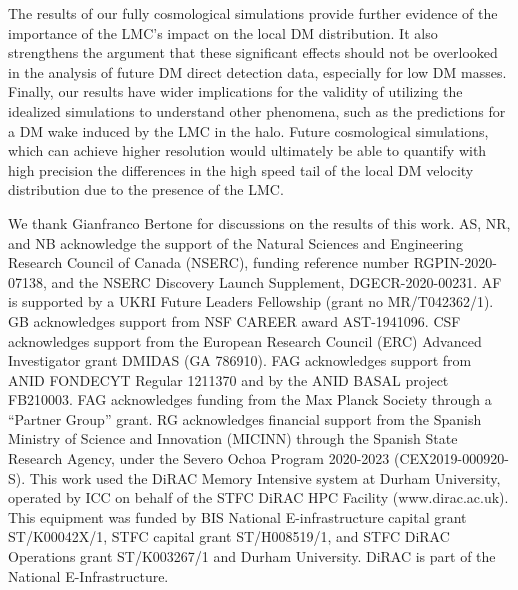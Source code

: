 The results of our fully cosmological simulations provide further evidence of the importance of the LMC's impact on the local DM distribution. It also strengthens the argument that these significant effects should not be overlooked in the analysis of future DM direct detection data, especially for low DM masses. Finally, our results have wider implications for the validity of utilizing the idealized simulations to understand other phenomena, such as the predictions for a DM wake induced by the LMC in the halo. Future cosmological simulations, which can achieve higher resolution would ultimately be able to quantify with high precision the differences in the high speed tail of the local DM velocity distribution due to the presence of the LMC.



\acknowledgments

We thank Gianfranco Bertone for discussions on the results of this work. AS, NR, and NB acknowledge the support of the Natural Sciences and Engineering Research Council of Canada (NSERC), funding reference number RGPIN-2020-07138, and the NSERC Discovery Launch Supplement, DGECR-2020-00231. AF is supported by a UKRI Future Leaders Fellowship (grant no MR/T042362/1). GB acknowledges support from NSF CAREER award AST-1941096. CSF acknowledges support from the European Research Council (ERC)
Advanced Investigator grant DMIDAS (GA 786910). FAG acknowledges support from ANID FONDECYT Regular 1211370 and by the ANID BASAL project FB210003. FAG acknowledges funding from the Max Planck Society through a ``Partner Group'' grant. RG acknowledges financial support from the Spanish Ministry of Science and Innovation (MICINN) through the Spanish State Research Agency, under the Severo Ochoa Program 2020-2023 (CEX2019-000920-S). This work used the DiRAC Memory Intensive system at Durham University, operated by ICC on behalf of the STFC DiRAC HPC Facility (www.dirac.ac.uk). This equipment was funded by BIS National E-infrastructure capital grant ST/K00042X/1, STFC capital grant ST/H008519/1, and STFC DiRAC Operations grant ST/K003267/1 and Durham University. DiRAC is part of the National E-Infrastructure.
